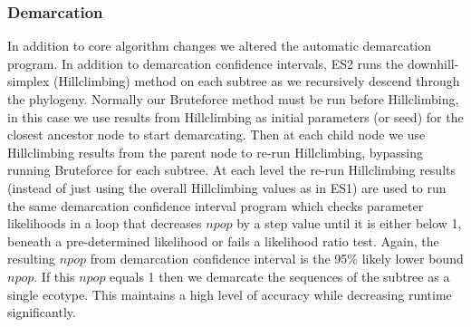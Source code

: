\subsubsection*{Demarcation}
In addition to core algorithm changes we altered the automatic demarcation program.
In addition to demarcation confidence intervals, ES2 runs the downhill-simplex (Hillclimbing) method on each subtree as we recursively descend through the phylogeny.
Normally our Bruteforce method must be run before Hillclimbing, in this case we use results from Hillclimbing as initial parameters (or seed) for the closest ancestor node to start demarcating.
Then at each child node we use Hillclimbing results from the parent node to re-run Hillclimbing, bypassing running Bruteforce for each subtree.
At each level the re-run Hillclimbing results (instead of just using the overall Hillclimbing values as in ES1) are used to run the same demarcation confidence interval program which checks parameter likelihoods in a loop that decreases $npop$ by a step value until it is either below 1, beneath a pre-determined likelihood or fails a likelihood ratio test.
Again, the resulting $npop$ from demarcation confidence interval is the 95\% likely lower bound $npop$.
If this $npop$ equals 1 then we demarcate the sequences of the subtree as a single ecotype.
This maintains a high level of accuracy while decreasing runtime significantly.

